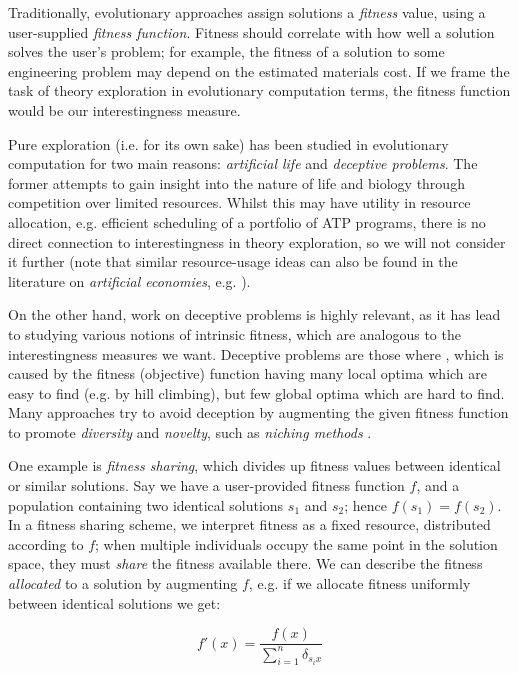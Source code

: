 Traditionally, evolutionary approaches assign solutions a \emph{fitness} value, using a user-supplied \emph{fitness function}. Fitness should correlate with how well a solution solves the user's problem; for example, the fitness of a solution to some engineering problem may depend on the estimated materials cost. If we frame the task of theory exploration in evolutionary computation terms, the fitness function would be our interestingness measure.

Pure exploration (i.e. for its own sake) has been studied in evolutionary computation for two main reasons: \emph{artificial life} and \emph{deceptive problems}. The former attempts to gain insight into the nature of life and biology through competition over limited resources. Whilst this may have utility in resource allocation, e.g. efficient scheduling of a portfolio of ATP programs, there is no direct connection to interestingness in theory exploration, so we will not consider it further (note that similar resource-usage ideas can also be found in the literature on \emph{artificial economies}, e.g. \citep{baum2000evolution}).

On the other hand, work on deceptive problems is highly relevant, as it has lead to studying various notions of intrinsic fitness, which are analogous to the interestingness measures we want. Deceptive problems are those where  \citep{lehman2011abandoning}, which is caused by the fitness (objective) function having many local optima which are easy to find (e.g. by hill climbing), but few global optima which are hard to find. Many approaches try to avoid deception by augmenting the given fitness function to promote \emph{diversity} and \emph{novelty}, such as \emph{niching methods} \citep{sareni1998fitness}.

One example is \emph{fitness sharing}, which divides up fitness values between identical or similar solutions. Say we have a user-provided fitness function $f$, and a population containing two identical solutions $s_1$ and $s_2$; hence $f(s_1) = f(s_2)$. In a fitness sharing scheme, we interpret fitness as a fixed resource, distributed according to $f$; when multiple individuals occupy the same point in the solution space, they must \emph{share} the fitness available there. We can describe the fitness \emph{allocated} to a solution by augmenting $f$, e.g. if we allocate fitness uniformly between identical solutions we get:

$$f'(x) = \frac{f(x)}{\sum_{i=1}^n \delta_{s_i x}}$$

